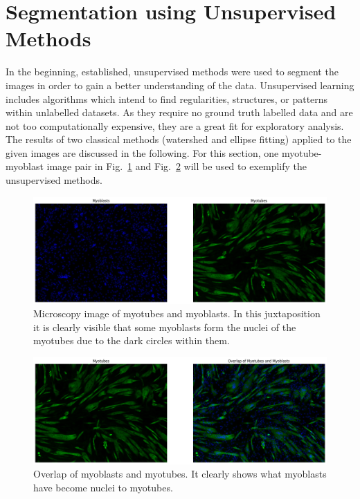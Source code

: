 \section{Segmentation using Unsupervised Methods}\label{secunsupervised}
In the beginning, established, unsupervised methods were used to segment the images in order to gain a better understanding of the data. Unsupervised learning includes algorithms which intend to find regularities, structures, or patterns within unlabelled datasets. As they require no ground truth labelled data and are not too computationally expensive, they are a great fit for exploratory analysis. The results of two classical methods (watershed and ellipse fitting) applied to the given images are discussed in the following. For this section, one myotube-myoblast image pair in Fig.~\ref{figtubeblast} and Fig.~\ref{figoverlap} will be used to exemplify the unsupervised methods.
\begin{figure}
	\centering
	\includegraphics[width=\textwidth]{"images/workhorse.png"}
	\caption[Workhorse image of myoblasts and myotubes]{Microscopy image of myotubes and myoblasts. In this juxtaposition it is clearly visible that some myoblasts form the nuclei of the myotubes due to the dark circles within them.}
	\label{figtubeblast}
\end{figure}

\begin{figure}
	\centering
	\includegraphics[width=\textwidth]{"images/overlap.png"}
	\caption[Overlap of myoblasts and myotubes]{Overlap of myoblasts and myotubes. It clearly shows what myoblasts have become nuclei to myotubes.}
	\label{figoverlap}
\end{figure}

